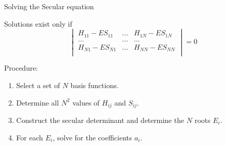 \documentclass[aspectratio=169]{beamer}
\begin{document}
\begin{frame}{Solving the Secular equation}

Solutions exist only if
\begin{equation*}
\begin{vmatrix}
H_{11}-ES_{11} & ... & H_{1N}-ES_{1N}\\
... & ... & ...\\
H_{N1}-ES_{N1} & ... & H_{NN}-ES_{NN}\\
\end{vmatrix}
= 0
\end{equation*}

Procedure:
\begin{enumerate}
    \item Select a set of $N$ basis functions.
    \item Determine all $N^2$ values of $H_{ij}$ and $S_{ij}$.
    \item Construct the secular determinant and determine the $N$ roots $E_i$.
    \item For each $E_i$, solve for the coefficients $a_i$.
\end{enumerate}
\end{frame}
\end{document}
